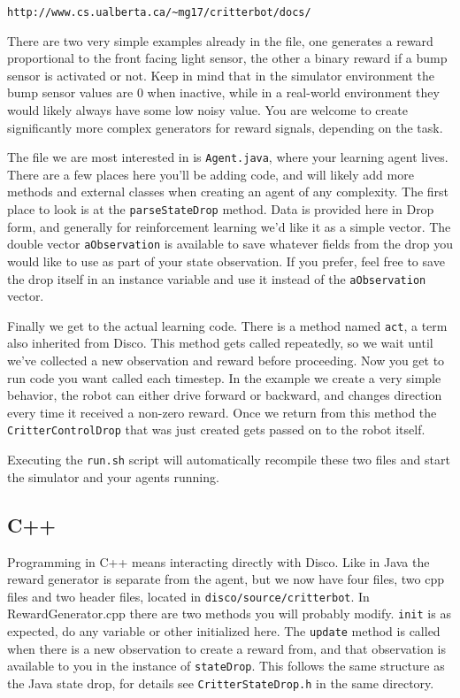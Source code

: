 \documentclass[12pt]{article}
\begin{document}
\begin{verbatim}
http://www.cs.ualberta.ca/~mg17/critterbot/docs/
\end{verbatim}

There are two very simple examples already in the file, one generates a reward proportional to the front facing light sensor, the other a binary reward if a bump sensor is activated or not.  Keep in mind that in the simulator environment the bump sensor values are 0 when inactive, while in a real-world environment they would likely always have some low noisy value.  You are welcome to create significantly more complex generators for reward signals, depending on the task.

The file we are most interested in is \verb+Agent.java+, where your learning agent lives.  There are a few places here you'll be adding code, and will likely add more methods and external classes when creating an agent of any complexity.  The first place to look is at the \verb+parseStateDrop+ method.  Data is provided here in Drop form, and generally for reinforcement learning we'd like it as a simple vector.  The double vector \verb+aObservation+ is available to save whatever fields from the drop you would like to use as part of your state observation.  If you prefer, feel free to save the drop itself in an instance variable and use it instead of the \verb+aObservation+ vector.

Finally we get to the actual learning code.  There is a method named \verb+act+, a term also inherited from Disco.  This method gets called repeatedly, so we wait until we've collected a new observation and reward before proceeding.  Now you get to run code you want called each timestep.  In the example we create a very simple behavior, the robot can either drive forward or backward, and changes direction every time it received a non-zero reward.  Once we return from this method the \verb+CritterControlDrop+ that was just created gets passed on to the robot itself.

Executing the \verb+run.sh+ script will automatically recompile these two files and start the simulator and your agents running.

\subsection{C++}\label{subsec:cpp_agent}

Programming in C++ means interacting directly with Disco.  Like in Java the reward generator is separate from the agent, but we now have four files, two cpp files and two header files, located in \verb+disco/source/critterbot+.  In RewardGenerator.cpp there are two methods you will probably modify.  \verb+init+ is as expected, do any variable or other initialized here.  The \verb+update+ method is called when there is a new observation to create a reward from, and that observation is available to you in the instance of \verb+stateDrop+.  This follows the same structure as the Java state drop, for details see \verb+CritterStateDrop.h+ in the same directory.
\end{document}

